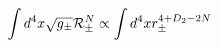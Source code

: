 \begin{equation}
        \label{D+1localop}
        \int d^4x \sqrt{g_\pm} {\cal R}_{\pm}^N
        \propto \int d^4x  r_\pm^{4+D_2 - 2N}
\end{equation}

